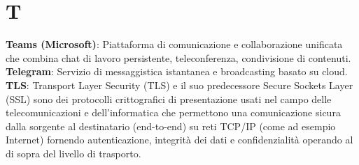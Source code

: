 \section*{T}
\textbf{Teams (Microsoft)}: Piattaforma di comunicazione e collaborazione unificata che combina chat di lavoro persistente, teleconferenza, condivisione di contenuti.\\
\textbf{Telegram}: Servizio di messaggistica istantanea e broadcasting basato su cloud.\\
\textbf{TLS}: Transport Layer Security (TLS) e il suo predecessore Secure Sockets Layer (SSL) sono dei protocolli crittografici di presentazione usati nel campo delle telecomunicazioni e
dell'informatica che permettono una comunicazione sicura dalla sorgente al destinatario (end-to-end) su reti TCP/IP (come ad esempio Internet) fornendo autenticazione, 
integrità dei dati e confidenzialità operando al di sopra del livello di trasporto.
